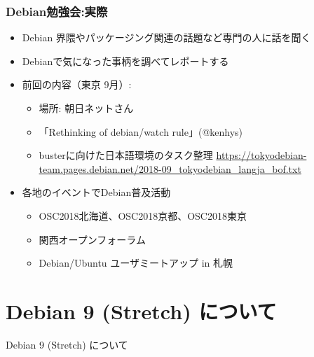 \begin{frame}
 \frametitle{Debian勉強会:実際}
 \begin{itemize}
  \item Debian 界隈やパッケージング関連の話題など専門の人に話を聞く
  \item Debianで気になった事柄を調べてレポートする
  \item 前回の内容（東京 9月）:\\
	\begin{itemize}
	\item 場所: 朝日ネットさん
    \item 「Rethinking of debian/watch rule」(@kenhys)
    \item busterに向けた日本語環境のタスク整理 \url{https://tokyodebian-team.pages.debian.net/2018-09_tokyodebian_langja_bof.txt}
	\end{itemize}
  \item 各地のイベントでDebian普及活動
	\begin{itemize}
      \item OSC2018北海道、OSC2018京都、OSC2018東京
      \item 関西オープンフォーラム
	  \item Debian/Ubuntu ユーザミートアップ in 札幌
	\end{itemize}
 \end{itemize}
\end{frame}


\section{Debian 9 (Stretch) について}

\begin{frame}
  \begin{center}\Huge{Debian 9 (Stretch) について}\end{center}
\end{frame}


